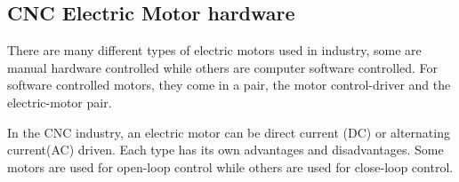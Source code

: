 \subsection{CNC Electric Motor hardware}

There are many different types of electric motors used in industry, some are manual hardware controlled while others are computer software controlled. For software controlled motors, they come in a pair, the motor control-driver and the electric-motor pair. 
\vspace*{1\baselineskip}

In the CNC industry, an electric motor can be direct current (DC) or alternating current(AC) driven. Each type has its own advantages and disadvantages. Some motors are used for open-loop control while others are used for close-loop control.



